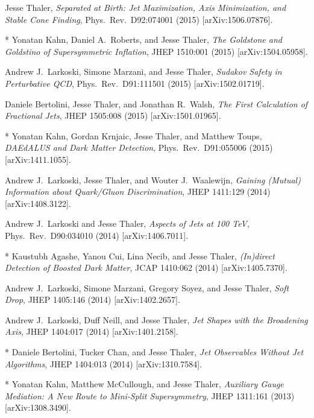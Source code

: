 \begin{list}{[]\addtocounter{jessecount}{-1}}{\leftmargin=3em \itemsep=4pt}
\item
 Jesse Thaler,
\emph{Separated at Birth: Jet Maximization, Axis Minimization, and Stable Cone Finding},
Phys.\ Rev.\ D92:074001 (2015)
[arXiv:1506.07876].

\item
* Yonatan Kahn, Daniel A.\ Roberts, and Jesse Thaler,
\emph{The Goldstone and Goldstino of Supersymmetric Inflation},
JHEP 1510:001 (2015)
[arXiv:1504.05958].

\item
 Andrew J.\ Larkoski, Simone Marzani, and Jesse Thaler,
\emph{Sudakov Safety in Perturbative QCD},
Phys.\ Rev.\ D91:111501 (2015)
[arXiv:1502.01719].

\item
 Daniele Bertolini, Jesse Thaler, and Jonathan R.\ Walsh,
\emph{The First Calculation of Fractional Jets},
JHEP 1505:008 (2015)
[arXiv:1501.01965].

\item
* Yonatan Kahn, Gordan Krnjaic, Jesse Thaler, and Matthew Toups,
\emph{DAEdALUS and Dark Matter Detection},
Phys.\ Rev.\ D91:055006 (2015)
[arXiv:1411.1055].

\item
 Andrew J.\ Larkoski, Jesse Thaler, and Wouter J.\ Waalewijn,
\emph{Gaining (Mutual) Information about Quark/Gluon Discrimination},
JHEP 1411:129 (2014)
[arXiv:1408.3122].

\item
 Andrew J.\ Larkoski and Jesse Thaler,
\emph{Aspects of Jets at 100 TeV},
Phys.\ Rev.\ D90:034010 (2014)
[arXiv:1406.7011].

\item
* Kaustubh Agashe, Yanou Cui, Lina Necib, and Jesse Thaler,
\emph{(In)direct Detection of Boosted Dark Matter},
JCAP 1410:062 (2014)
[arXiv:1405.7370].

\item
 Andrew J.\ Larkoski, Simone Marzani, Gregory Soyez, and Jesse Thaler,
\emph{Soft Drop},
JHEP 1405:146 (2014)
[arXiv:1402.2657].

\item
 Andrew J.\ Larkoski, Duff Neill, and Jesse Thaler,
\emph{Jet Shapes with the Broadening Axis},
JHEP 1404:017 (2014)
[arXiv:1401.2158].

\item
* Daniele Bertolini, Tucker Chan, and Jesse Thaler,
\emph{Jet Observables Without Jet Algorithms},
JHEP 1404:013 (2014)
[arXiv:1310.7584].

\item
* Yonatan Kahn, Matthew McCullough, and Jesse Thaler,
\emph{Auxiliary Gauge Mediation: A New Route to Mini-Split Supersymmetry},
JHEP 1311:161 (2013)
[arXiv:1308.3490].


\end{list}
